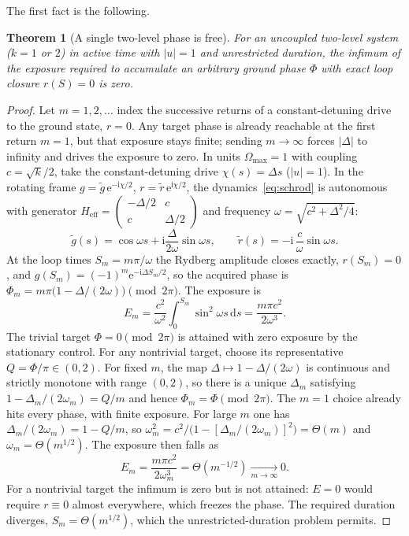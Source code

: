 \documentclass[aps,prx,reprint,nofootinbib,longbibliography,floatfix]{revtex4-2}
\newtheorem{theorem}{Theorem}
\theoremstyle{plain}
\theoremstyle{remark}
\newcommand{\Omax}{\Omega_{\max}}
\newcommand{\dd}{\mathrm{d}}
\newcommand{\ee}{\mathrm{e}}
\newcommand{\ii}{\mathrm{i}}
\begin{document}
The first fact is the following.
\begin{theorem}[A single two-level phase is free]
\label{thm:free}
For an uncoupled two-level system ($k=1$ or $2$) in active time with $|u|=1$ and unrestricted duration, the infimum of the exposure required to accumulate an arbitrary ground phase $\Phi$ with exact loop closure $r(S)=0$ is zero.
\end{theorem}
\begin{proof}
Let $m=1,2,\ldots$ index the successive returns of a constant-detuning drive to the ground state, $r=0$. Any target phase is already reachable at the first return $m=1$, but that exposure stays finite; sending $m\to\infty$ forces $|\Delta|$ to infinity and drives the exposure to zero. In units $\Omax=1$ with coupling $c=\sqrt{k}/2$, take the constant-detuning drive $\chi(s)=\Delta s$ ($|u|=1$). In the rotating frame $g=\tilde g\,\ee^{-\ii\chi/2}$, $r=\tilde r\,\ee^{\ii\chi/2}$, the dynamics~\eqref{eq:schrod} is autonomous with generator $H_{\mathrm{eff}}=\begin{pmatrix}-\Delta/2 & c\\ c & \Delta/2\end{pmatrix}$ and frequency $\omega=\sqrt{c^2+\Delta^2/4}$:
\begin{equation}
\tilde g(s)=\cos\omega s+\ii\frac{\Delta}{2\omega}\sin\omega s,
\qquad
\tilde r(s)=-\ii\,\frac{c}{\omega}\sin\omega s .
\end{equation}
At the loop times $S_m=m\pi/\omega$ the Rydberg amplitude closes exactly, $r(S_m)=0$, and $g(S_m)=(-1)^m\ee^{-\ii\Delta S_m/2}$, so the acquired phase is $\Phi_m=m\pi\bigl(1-\Delta/(2\omega)\bigr)\pmod{2\pi}$. The exposure is
\begin{equation}
E_m=\frac{c^2}{\omega^2}\int_0^{S_m}\sin^2\omega s\,\dd s=\frac{m\pi c^2}{2\omega^3}.
\end{equation}
The trivial target $\Phi=0\pmod{2\pi}$ is attained with zero exposure by the stationary control. For any nontrivial target, choose its representative $Q=\Phi/\pi\in(0,2)$. For fixed $m$, the map $\Delta\mapsto 1-\Delta/(2\omega)$ is continuous and strictly monotone with range $(0,2)$, so there is a unique $\Delta_m$ satisfying $1-\Delta_m/(2\omega_m)=Q/m$ and hence $\Phi_m=\Phi\pmod{2\pi}$. The $m=1$ choice already hits every phase, with finite exposure. For large $m$ one has $\Delta_m/(2\omega_m)=1-Q/m$, so $\omega_m^2=c^2\big/\bigl(1-[\Delta_m/(2\omega_m)]^2\bigr)=\Theta(m)$ and $\omega_m=\Theta(m^{1/2})$. The exposure then falls as
\begin{equation}
E_m=\frac{m\pi c^2}{2\omega_m^3}=\Theta(m^{-1/2})\xrightarrow[m\to\infty]{}0 .
\end{equation}
For a nontrivial target the infimum is zero but is not attained: $E=0$ would require $r\equiv 0$ almost everywhere, which freezes the phase. The required duration diverges, $S_m=\Theta(m^{1/2})$, which the unrestricted-duration problem permits.
\end{proof}
\end{document}
